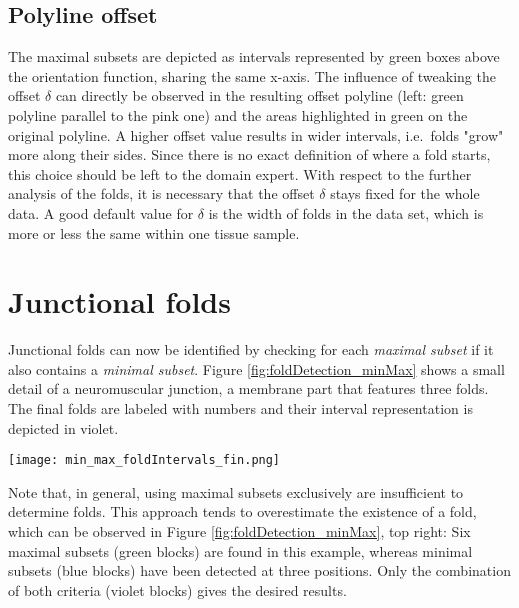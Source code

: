 \documentclass[twocolumn,a4paper]{article}
\begin{document}
\subsection{Polyline offset}
The maximal subsets are depicted as intervals represented by green boxes above the orientation function, sharing the same x-axis.
The influence of tweaking the offset $\delta$ can directly be observed in the resulting offset polyline (left: green polyline parallel to the pink one) and the areas highlighted in green on the original polyline.
A higher offset value results in wider intervals, i.e.\ folds "grow" more along their sides. Since there is no exact definition of where a fold starts, this choice should be left to the domain expert. 
With respect to the further analysis of the folds, it is necessary that the offset $\delta$ stays fixed for the whole data.
A good default value for $\delta$ is the width of folds in the data set, which is more or less the same within one tissue sample.

\section{Junctional folds}
Junctional folds can now be identified by checking for each \emph{maximal subset} if it also contains a \emph{minimal subset}. 
Figure \ref{fig:foldDetection_minMax} shows a small detail of a neuromuscular junction, a membrane part that features three folds. The final folds are labeled with numbers and their interval representation is depicted in violet.

\begin{figure*}[htbp]
    \centering
    \texttt{[image: min\_max\_foldIntervals\_fin.png]}
    \caption{\label{fig:foldDetection_minMax}
        The three descending slopes of the orientation function on the right hand side correspond three \emph{minimal subsets}. The
        intersections of the green polyline on the left determine the \emph{maximal subsets}. The intervals are represented in
        blue (minimal) and green (maximal) as colored blocks above the function and on the polyline on the left. }
\end{figure*}

Note that, in general, using maximal subsets exclusively are insufficient to determine folds.
This approach tends to overestimate the existence of a fold, which can be observed in Figure \ref{fig:foldDetection_minMax}, top right:
Six maximal subsets (green blocks) are found in this example, whereas minimal subsets (blue blocks) have been detected at three positions. 
Only the combination of both criteria (violet blocks) gives the desired results.
\end{document}
